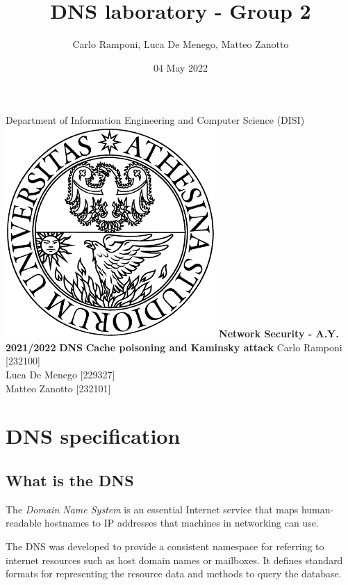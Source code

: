 \documentclass[11pt,a4paper]{article}
\title{DNS laboratory - Group 2}
\author{Carlo Ramponi, Luca De Menego, Matteo Zanotto}
\date{04 May 2022}
\begin{document}
\begin{titlepage}

\centering
    \vfill
    \vskip3cm
    \Large Department of Information Engineering and Computer Science
    \vskip0.5cm
    \Large (DISI)
    \vskip2cm
    \includegraphics[width=8cm]{logo_unitn.png}
    \vskip2cm
    \textbf{\Large Network Security - A.Y. 2021/2022}
    \vskip2cm
    \textbf{\LARGE DNS}
    \vskip0.2cm
    \textbf{\LARGE Cache poisoning and Kaminsky attack}
    \vskip3cm
    \Large Carlo Ramponi [232100]\\Luca De Menego [229327]\\Matteo Zanotto [232101]
    \vfill

\end{titlepage}

\clearpage

\tableofcontents

\clearpage

\section{DNS specification}

\subsection{What is the DNS}

The \emph{Domain Name System} is an essential Internet service that maps human-readable hostnames to IP addresses that machines in networking can use.

\noindent
The DNS was developed to provide a consistent namespace for referring to internet resources such as host domain names or mailboxes. It defines standard formats for representing the resource data and methods to query the database.
\end{document}
